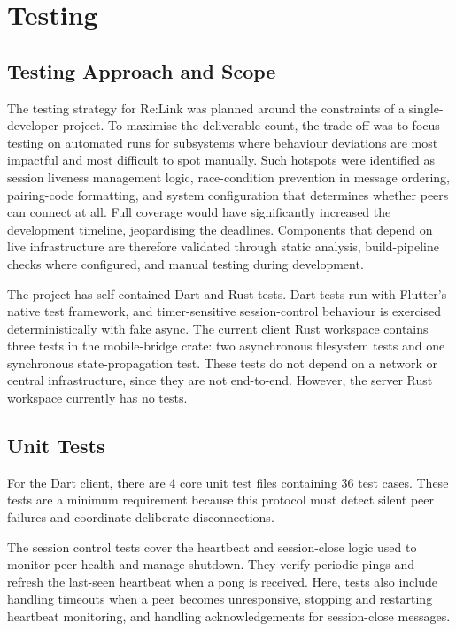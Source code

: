 \documentclass[12pt,a4paper,oneside]{report}
\begin{document}
\section{Testing}
\label{sec:testing}

\subsection{Testing Approach and Scope}
\label{sec:testing-approach}

The testing strategy for Re:Link was planned around the constraints of a single-developer project. To maximise the deliverable count, the trade-off was to focus testing on automated runs for subsystems where behaviour deviations are most impactful and most difficult to spot manually. Such hotspots were identified as session liveness management logic, race-condition prevention in message ordering, pairing-code formatting, and system configuration that determines whether peers can connect at all. Full coverage would have significantly increased the development timeline, jeopardising the deadlines. Components that depend on live infrastructure are therefore validated through static analysis, build-pipeline checks where configured, and manual testing during development.

The project has self-contained Dart and Rust tests. Dart tests run with Flutter's native test framework, and timer-sensitive session-control behaviour is exercised deterministically with fake async. The current client Rust workspace contains three tests in the mobile-bridge crate: two asynchronous filesystem tests and one synchronous state-propagation test. These tests do not depend on a network or central infrastructure, since they are not end-to-end. However, the server Rust workspace currently has no tests.


\subsection{Unit Tests}
\label{sec:unit-tests}

For the Dart client, there are 4 core unit test files containing 36 test cases. These tests are a minimum requirement because this protocol must detect silent peer failures and coordinate deliberate disconnections.

The session control tests cover the heartbeat and session-close logic used to monitor peer health and manage shutdown. They verify periodic pings and refresh the last-seen heartbeat when a pong is received. Here, tests also include handling timeouts when a peer becomes unresponsive, stopping and restarting heartbeat monitoring, and handling acknowledgements for session-close messages.
\end{document}

